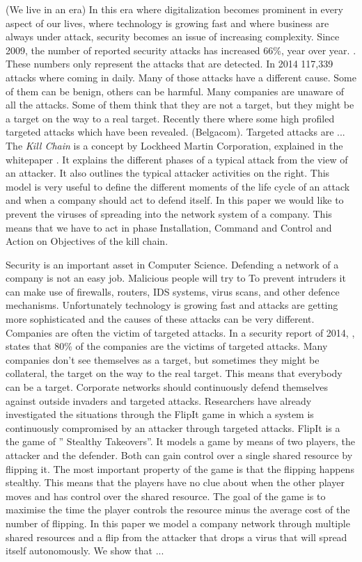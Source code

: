 (We live in an era) In this era where digitalization becomes prominent in every aspect of our lives, where technology is growing fast and where business are always under attack, security becomes an issue of increasing complexity. Since 2009, the number of reported security attacks has increased 66\%, year over year. . These numbers only represent the attacks that are detected. In 2014 117,339 attacks where coming in daily. Many of those attacks have a different cause. Some of them can be benign, others can be harmful. Many companies are unaware of all the attacks. Some of them think that they are not a target, but they might be a target on the way to a real target. Recently there where some high profiled targeted attacks which have been revealed. (Belgacom). 
Targeted attacks are ...
The \textit{Kill Chain} is a concept by Lockheed Martin Corporation, explained in the whitepaper . It explains the different phases of a typical attack from the view of an attacker. It also outlines the typical attacker activities on the right. This model is very useful to define the different moments of the life cycle of an attack and when a company should act to defend itself. In this paper we would like to prevent the viruses of spreading into the network system of a company. This means that we have to act in phase Installation, Command and Control and Action on Objectives of the kill chain. 

 
  Security is an important asset in Computer Science. Defending a network of a company is not an easy job. Malicious people will try to  To prevent intruders it can make use of firewalls, routers, IDS systems, virus scans, and other defence mechanisms. Unfortunately technology is growing fast and attacks are getting more sophisticated and the causes of these attacks can be very different.  Companies are often the victim of targeted attacks. In a security report of 2014, , states that 80\% of the companies are the victims of targeted attacks. Many companies don't see themselves as a target, but sometimes they might be collateral, the target on the way to the real target. This means that everybody can be a target. 
Corporate networks should continuously defend themselves against outside invaders and targeted attacks. Researchers have already investigated the situations through the FlipIt game in which a system is continuously compromised by an attacker through targeted attacks. 
FlipIt is a the game of '' Stealthy Takeovers''. It models a game by means of two players, the attacker and the defender. Both can gain control over a single shared resource by flipping it. The most important property of the game is that the flipping happens stealthy. This means that the players have no clue about when the other player moves and has control over the shared resource. The goal of the game is to maximise the time the player controls the resource minus the average cost of the number of flipping.
In this paper we model a company network through multiple shared resources and a flip from the attacker that drops a virus that will spread itself autonomously. We show that ...


